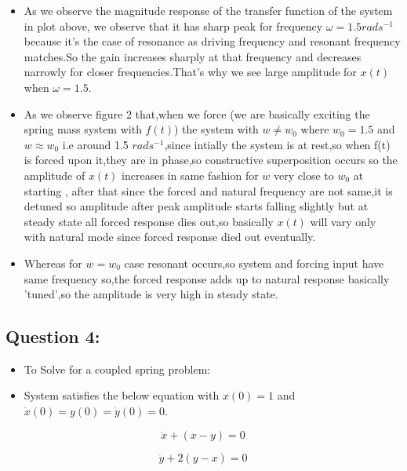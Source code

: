 \documentclass[11pt]{article}
\providecommand{\tightlist}{%
      \setlength{\itemsep}{0pt}\setlength{\parskip}{0pt}}
\begin{document}
\begin{itemize}
\tightlist
\item
  As we observe the magnitude response of the transfer function of the
  system in plot above, we observe that it has sharp peak for frequency
  \(\omega = 1.5 rads^{-1}\) because it's the case of resonance as
  driving frequency and resonant frequency matches.So the gain increases
  sharply at that frequency and decreases narrowly for closer
  frequencies.That's why we see large amplitude for \(x(t)\) when
  \(\omega = 1.5\).
\item
  As we observe figure 2 that,when we force (we are basically exciting
  the spring mass system with \(f(t)\)) the system with \(w \neq w_0\)
  where \(w_0 = 1.5\) and \(w \approx w_0\) i.e around 1.5
  \(rads^{-1}\),since intially the system is at rest,so when f(t) is
  forced upon it,they are in phase,so constructive superposition occurs
  so the amplitude of \(x(t)\) increases in same fashion for \(w\) very
  close to \(w_0\) at starting , after that since the forced and natural
  frequency are not same,it is detuned so amplitude after peak amplitude
  starts falling slightly but at steady state all forced response dies
  out,so basically \(x(t)\) will vary only with natural mode since
  forced response died out eventually.
\item
  Whereas for \(w=w_0\) case resonant occurs,so system and forcing input
  have same frequency so,the forced response adds up to natural response
  basically 'tuned',so the amplitude is very high in steady state.
\end{itemize}

    \subsection{Question 4:}\label{question-4}

\begin{itemize}
\item
  To Solve for a coupled spring problem:
\item
  System satisfies the below equation with \(x(0) = 1\) and
  \(\dot x(0) = y(0) = \dot y(0) = 0\).
\end{itemize}

\begin{equation}
\ddot x + (x-y) = 0
\end{equation}

\begin{equation}
\ddot y + 2(y-x)= 0
\end{equation}
\end{document}
